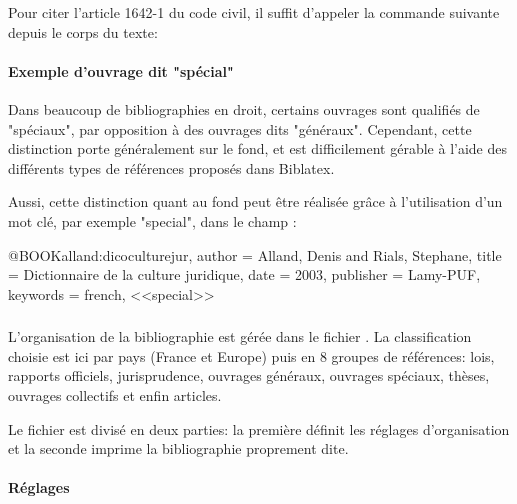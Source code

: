 \documentclass{ltxdockit}
\newcommand*{\biblatex}{Biblatex\xspace}
\begin{document}
Pour citer l'article 1642-1 du code civil, il suffit d'appeler la commande suivante depuis le corps du texte:

\paragraph{Exemple d'ouvrage dit "spécial"}

Dans beaucoup de bibliographies en droit, certains ouvrages sont qualifiés de "spéciaux", par opposition à des ouvrages dits "généraux". Cependant, cette distinction porte généralement sur le fond, et est difficilement gérable à l'aide des différents types de références proposés dans \biblatex.

Aussi, cette distinction quant au fond peut être réalisée grâce à l'utilisation d'un mot clé, par exemple "special", dans le champ :

\begin{ltxexample}
@BOOK{alland:dicoculturejur,
  author = {Alland, Denis and Rials, Stephane},
  title = {Dictionnaire de la culture juridique},
  date = {2003},
  publisher = {Lamy-PUF},
  keywords = {french, <<special>>}
}
\end{ltxexample}

\subsubsection{}

L'organisation de la bibliographie est gérée dans le fichier . La classification choisie est ici par pays (France et Europe) puis en 8 groupes de références: lois, rapports officiels, jurisprudence, ouvrages généraux, ouvrages spéciaux, thèses, ouvrages collectifs et enfin articles.

Le fichier est divisé en deux parties: la première définit les réglages d'organisation et la seconde imprime la bibliographie proprement dite.

\paragraph{Réglages}
\end{document}
